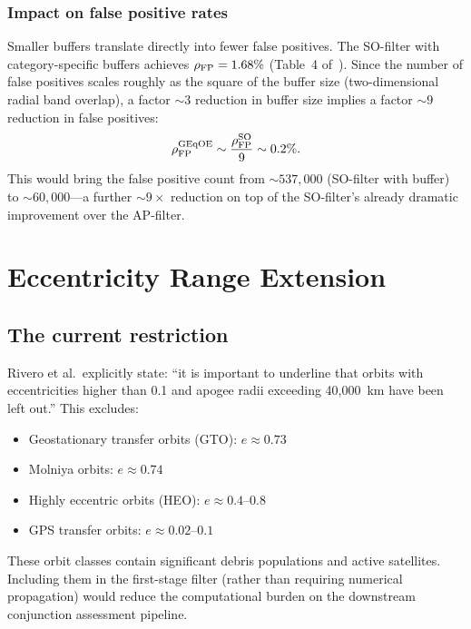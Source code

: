 \documentclass[11pt]{article}
\begin{document}
\subsubsection{Impact on false positive rates}

Smaller buffers translate directly into fewer false positives. The SO-filter
with category-specific buffers achieves $\rho_{\rm FP} = 1.68\%$ (Table~4
of~\cite{rivero2025}). Since the number of false positives scales roughly as
the square of the buffer size (two-dimensional radial band overlap), a factor
$\sim\!3$ reduction in buffer size implies a factor $\sim\!9$ reduction in
false positives:
\begin{equation}
\rho_{\rm FP}^{\rm GEqOE} \sim \frac{\rho_{\rm FP}^{\rm SO}}{9}
\sim 0.2\%.
\end{equation}
This would bring the false positive count from $\sim\!537{,}000$ (SO-filter
with buffer) to $\sim\!60{,}000$---a further $\sim\!9\times$ reduction on top
of the SO-filter's already dramatic improvement over the AP-filter.

\section{Eccentricity Range Extension}
\label{sec:eccentricity}

\subsection{The current restriction}

Rivero et al.\ explicitly state: ``it is important to underline that orbits
with eccentricities higher than 0.1 and apogee radii exceeding 40,000~km
have been left out.'' This excludes:
\begin{itemize}
\item Geostationary transfer orbits (GTO): $e \approx 0.73$
\item Molniya orbits: $e \approx 0.74$
\item Highly eccentric orbits (HEO): $e \approx 0.4$--$0.8$
\item GPS transfer orbits: $e \approx 0.02$--$0.1$
\end{itemize}

These orbit classes contain significant debris populations and active
satellites. Including them in the first-stage filter (rather than requiring
numerical propagation) would reduce the computational burden on the
downstream conjunction assessment pipeline.
\end{document}
